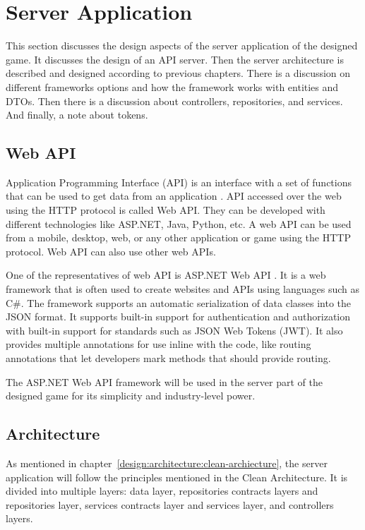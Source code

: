 \section{Server Application}

This section discusses the design aspects of the server application of the designed game.
It discusses the design of an API server.
Then the server architecture is described and designed according to previous chapters.
There is a discussion on different frameworks options and how the framework works with entities and DTOs.
Then there is a discussion about controllers, repositories, and services.
And finally, a note about tokens.

\subsection{Web API}

Application Programming Interface (API) is an interface with a set of functions that can be used to get data from an application \cite{a2022_aspnet}.
API accessed over the web using the HTTP protocol is called Web API.
They can be developed with different technologies like ASP.NET, Java, Python, etc.
A web API can be used from a mobile, desktop, web, or any other application or game using the HTTP protocol.
Web API can also use other web APIs.

One of the representatives of web API is ASP.NET Web API \cite{a2022_aspnet}.
It is a web framework that is often used to create websites and APIs using languages such as C\#.
The framework supports an automatic serialization of data classes into the JSON format.
It supports built-in support for authentication and authorization with built-in support for standards such as JSON Web Tokens (JWT).
It also provides multiple annotations for use inline with the code, like routing annotations that let developers mark methods that should provide routing.

The ASP.NET Web API framework will be used in the server part of the designed game for its simplicity and industry-level power.

\subsection{Architecture}

As mentioned in chapter~\ref{design:architecture:clean-archiecture}, the server application will follow the principles mentioned in the Clean Architecture.
It is divided into multiple layers: data layer, repositories contracts layers and repositories layer, services contracts layer and services layer, and controllers layers.

